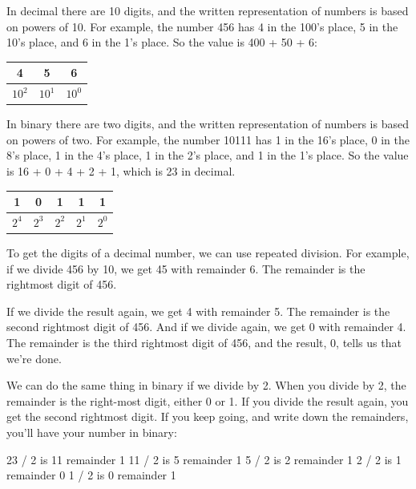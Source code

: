
In decimal there are 10 digits, and the written representation of numbers is based on powers of 10.
For example, the number 456 has 4 in the 100's place, 5 in the 10's place, and 6 in the 1's place.
So the value is 400 + 50 + 6:

\begin{center}
\begin{tabular}{|c|c|c|}
\hline
4 & 5 & 6 \\
\hline
$10^2$ & $10^1$ & $10^0$ \\
\hline
\end{tabular}
\end{center}

In binary there are two digits, and the written representation of numbers is based on powers of two.
For example, the number 10111 has 1 in the 16's place, 0 in the 8's place, 1 in the 4's place, 1 in the 2's place, and 1 in the 1's place.
So the value is 16 + 0 + 4 + 2 + 1, which is 23 in decimal.

\begin{center}
\begin{tabular}{|c|c|c|c|c|}
\hline
1 & 0 & 1 & 1 & 1 \\
\hline
$2^4$ & $2^3$ & $2^2$ & $2^1$ & $2^0$ \\
\hline
\end{tabular}
\end{center}

To get the digits of a decimal number, we can use repeated division.
For example, if we divide 456 by 10, we get 45 with remainder 6.
The remainder is the rightmost digit of 456.

If we divide the result again, we get 4 with remainder 5.
The remainder is the second rightmost digit of 456.
And if we divide again, we get 0 with remainder 4.
The remainder is the third rightmost digit of 456, and the result, 0, tells us that we're done.

We can do the same thing in binary if we divide by 2.
When you divide by 2, the remainder is the right-most digit, either 0 or 1.
If you divide the result again, you get the second rightmost digit.
If you keep going, and write down the remainders, you'll have your number in binary:

\begin{stdout}
23 / 2 is 11 remainder 1
11 / 2 is  5 remainder 1
 5 / 2 is  2 remainder 1
 2 / 2 is  1 remainder 0
 1 / 2 is  0 remainder 1
\end{stdout}

